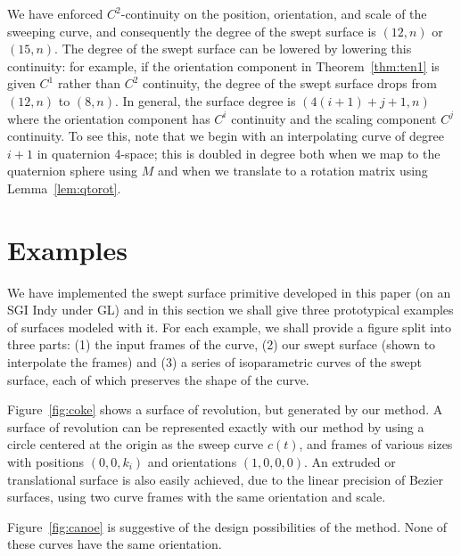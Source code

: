 We have enforced $C^2$-continuity on the position, orientation,
and scale of the sweeping curve, and consequently the degree of the
swept surface is $(12,n)$ or $(15,n)$.
The degree of the swept surface can be lowered by lowering this continuity:
for example, if the orientation component
in Theorem~\ref{thm:ten1} is given $C^1$ rather than $C^2$ continuity, 
the degree of the swept surface drops from $(12,n)$ to $(8,n)$.
In general, the surface degree is $(4(i+1)+j+1,n)$ where the orientation
component has $C^i$ continuity and the scaling component $C^j$ continuity.
To see this, note that we begin with an interpolating curve of degree $i+1$
in quaternion 4-space; this is doubled in degree both when we map to the 
quaternion sphere using $M$ and when we translate to a rotation matrix
using Lemma~\ref{lem:qtorot}.

\section{Examples}
\label{sec:eg}

We have implemented the swept surface primitive developed in this paper
(on an SGI Indy under GL) and in this section we shall give three
prototypical examples of surfaces modeled with it.
For each example, we shall provide a figure split into three parts:
(1) the input frames of the curve, 
(2) our swept surface (shown to interpolate the frames)
and (3) a series of isoparametric curves of the swept surface,
each of which preserves the shape of the curve.

\begin{example}
Figure~\ref{fig:coke} shows a surface of revolution, but generated
by our method.
A surface of revolution can be represented exactly with our method
by using a circle 
centered at the origin
as the sweep curve $c(t)$, and frames of various sizes with positions
$(0,0,k_i)$ and orientations $(1,0,0,0)$.
An extruded  or translational surface is also easily achieved, due to
the linear precision of Bezier surfaces, using two curve frames
with the same orientation and scale.
\end{example}

\begin{example}
Figure~\ref{fig:canoe} is suggestive of the design
possibilities of the method.
None of these curves have the same orientation.
\end{example}

